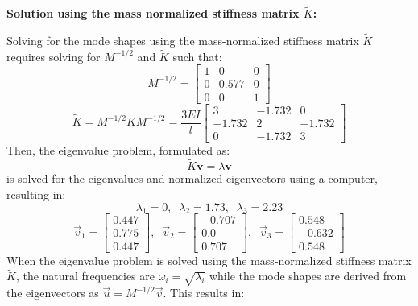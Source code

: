 \documentclass[12pt,letter]{article}
\begin{document}
\begin{example}
 \noindent \textbf{Solution using the mass normalized stiffness matrix $\tilde{K}$:}

 
 \noindent  Solving for the mode shapes using the mass-normalized stiffness matrix $\tilde{K}$ requires solving for $M^{-1/2}$ and $\tilde{K}$ such that:
 \begin{equation}
    M^{-1/2} = \begin{bmatrix} 1 & 0 & 0 \\    0  & 0.577 & 0 \\ 0  & 0 & 1 \end{bmatrix}
 \end{equation}
 \begin{equation}
     \tilde{K} = M^{-1/2} K M^{-1/2} = \frac{3EI}{l} \begin{bmatrix} 3 & -1.732 & 0 \\  -1.732  & 2 & -1.732 \\  0  & -1.732 & 3 \end{bmatrix} 
 \end{equation}
 Then, the eigenvalue problem, formulated as:
 \begin{equation}
 \tilde{K} \textbf{v} = \lambda \textbf{v}
 \end{equation}
 is solved for the eigenvalues and normalized eigenvectors using a computer, resulting in:
 \begin{equation}
 \lambda_1 = 0, \; \; \lambda_2 = 1.73, \; \; \lambda_3 = 2.23
 \end{equation}
 \begin{equation}
 \vec{v}_1 = \begin{bmatrix} 0.447 \\    0.775 \\    0.447  \end{bmatrix}, \; \; \vec{v}_2 = \begin{bmatrix} -0.707 \\    0.0 \\    0.707 \end{bmatrix}, \; \; \vec{v}_3 = \begin{bmatrix} 0.548 \\    -0.632 \\    0.548  \end{bmatrix}
 \end{equation}
 When the eigenvalue problem is solved using the mass-normalized stiffness matrix $\tilde{K}$, the natural frequencies are $\omega_i = \sqrt{\lambda_i}$ while the mode shapes are derived from the eigenvectors as $\vec{u}=M^{-1/2}\vec{v}$. This results in:

\end{example}
\end{document}
